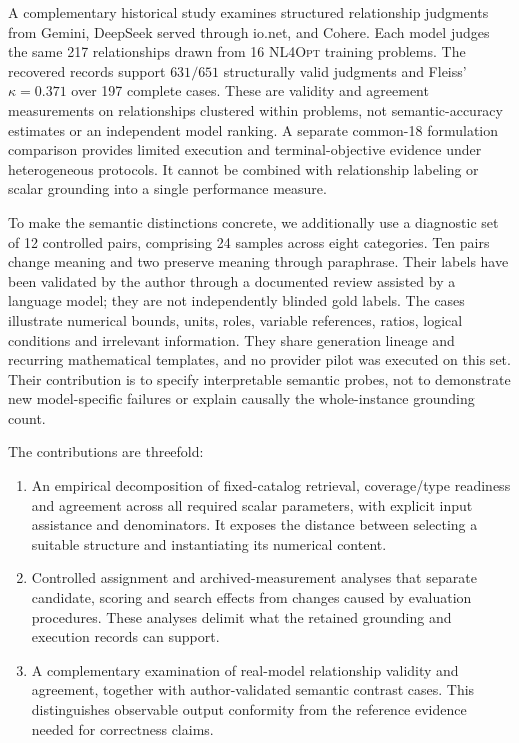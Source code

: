 \documentclass[pdflatex,iicol,sn-basic,Numbered]{sn-jnl}
\begin{document}
A complementary historical study examines structured relationship judgments from Gemini, DeepSeek served through io.net, and Cohere. Each model judges the same 217 relationships drawn from 16 \textsc{NL4Opt} training problems. The recovered records support $631/651$ structurally valid judgments and Fleiss' $\kappa=0.371$ over 197 complete cases. These are validity and agreement measurements on relationships clustered within problems, not semantic-accuracy estimates or an independent model ranking. A separate common-18 formulation comparison provides limited execution and terminal-objective evidence under heterogeneous protocols. It cannot be combined with relationship labeling or scalar grounding into a single performance measure.

To make the semantic distinctions concrete, we additionally use a diagnostic set of 12 controlled pairs, comprising 24 samples across eight categories. Ten pairs change meaning and two preserve meaning through paraphrase. Their labels have been validated by the author through a documented review assisted by a language model; they are not independently blinded gold labels. The cases illustrate numerical bounds, units, roles, variable references, ratios, logical conditions and irrelevant information. They share generation lineage and recurring mathematical templates, and no provider pilot was executed on this set. Their contribution is to specify interpretable semantic probes, not to demonstrate new model-specific failures or explain causally the whole-instance grounding count.

The contributions are threefold:
\label{subsec:intro_contributions}
\begin{enumerate}
\item An empirical decomposition of fixed-catalog retrieval, coverage/type readiness and agreement across all required scalar parameters, with explicit input assistance and denominators. It exposes the distance between selecting a suitable structure and instantiating its numerical content.
\item Controlled assignment and archived-measurement analyses that separate candidate, scoring and search effects from changes caused by evaluation procedures. These analyses delimit what the retained grounding and execution records can support.
\item A complementary examination of real-model relationship validity and agreement, together with author-validated semantic contrast cases. This distinguishes observable output conformity from the reference evidence needed for correctness claims.
\end{enumerate}
\end{document}
